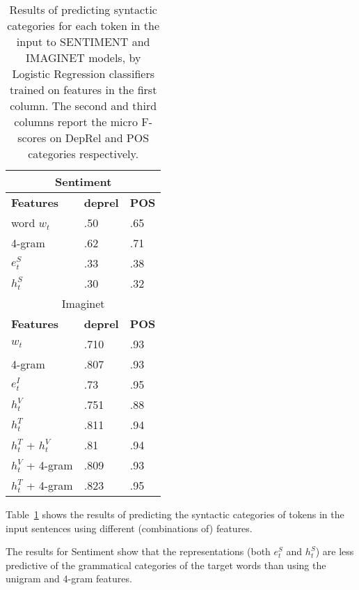 \begin{table}[]
\centering
\caption{Results of predicting syntactic categories for each token in the input to 
SENTIMENT and IMAGINET models, by Logistic Regression classifiers trained 
on features in the first column. The second and third columns report the micro F-
scores on DepRel and POS categories respectively.}

\label{tab:logistic}
\begin{tabular}{lll}
\hline
 \multicolumn{3}{c}{\sc Sentiment}           \\
 \hline 
{\bf Features}      &  {\bf deprel} &  {\bf POS}     \\
\hline 
word $w_t$                   		  & .50  & .65   \\
4-gram                       		  & .62  & .71   \\
$e^S_{t}$          & .33  & .38   \\ 
$h_t^S$                      		  & .30  & .32    \\
\hline 
\hline
\multicolumn{3}{c}{\sc Imaginet}                          \\
 \hline 
{\bf Features}      &  {\bf deprel} &  {\bf POS}     \\
\hline 
$w_t$                   		  	      & .710   & .93  \\
4-gram                         		  & .807  & .93  \\
$e^I_{t}$          			  	      & .73   & .95  \\ 
$h_t^V$                      		  & .751  & .88  \\
$h_t^T$                      		  & .811  & .94  \\
$h_t^T$ + $h_t^V$            		  & .81   & .94  \\
$h_t^V$ + 4-gram             		  & .809   & .93  \\
$h_t^T$ + 4-gram             		  & .823   & .95
\end{tabular}
\end{table}

Table~\ref{tab:logistic} shows the results of predicting the syntactic categories of 
tokens in the input sentences using different (combinations of) features. 

The results for {\sc Sentiment} show that the representations (both 
$e^S_{t}$ and $h_t^S$) are less predictive of the grammatical categories of the 
target words than using the unigram and 4-gram features.

